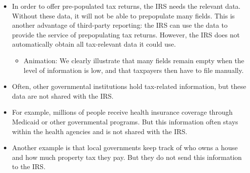 \documentclass[11pt]{article}
\begin{document}
\begin{itemize}
\begin{itemize}
    \end{itemize}
    \item In order to offer pre-populated tax returns, the IRS needs the relevant data. Without these data, it will not be able to prepopulate many fields. This is another advantage of third-party reporting: the IRS can use the data to provide the service of prepopulating tax returns. However, the IRS does not automatically obtain all tax-relevant data it could use.
    \begin{itemize}
        \item Animation: We clearly illustrate that many fields remain empty when the level of information is low, and that taxpayers then have to file manually.
    \end{itemize}
    \item Often, other governmental institutions hold tax-related information, but these data are not shared with the IRS.
    \item For example, millions of people receive health insurance coverage through Medicaid or other governmental programs. But this information often stays within the health agencies and is not shared with the IRS. %
    \item Another example is that local governments keep track of who owns a house and how much property tax they pay. But they do not send this information to the IRS. %

\end{itemize}
\end{document}
